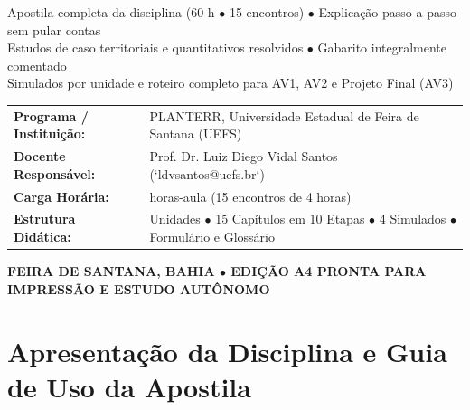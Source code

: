 \begin{titlepage}
\begin{center}
  {\color{bgAmber}\normalsize Apostila completa da disciplina (60 h $\bullet$ 15 encontros) $\bullet$ Explicação passo a passo sem pular contas\\
  Estudos de caso territoriais e quantitativos resolvidos $\bullet$ Gabarito integralmente comentado\\
  Simulados por unidade e roteiro completo para AV1, AV2 e Projeto Final (AV3)}
\end{center}

\vspace{3.0cm}

\begin{center}
  \begin{tcolorbox}[colback=white, colframe=etIndigo, arc=4pt, boxrule=1pt, width=0.90\textwidth, left=14pt, right=14pt, top=12pt, bottom=12pt]
    \begin{tabularx}{\textwidth}{@{}l >{\raggedright\arraybackslash}X@{}}
      \textbf{\color{etIndigo}Programa / Instituição:} & PLANTERR, Universidade Estadual de Feira de Santana (UEFS) \\
      \textbf{\color{etIndigo}Docente Responsável:} & Prof. Dr. Luiz Diego Vidal Santos (`ldvsantos@uefs.br`) \\
      \textbf{\color{etIndigo}Carga Horária:} & 60 horas-aula (15 encontros de 4 horas) \\
      \textbf{\color{etIndigo}Estrutura Didática:} & 4 Unidades $\bullet$ 15 Capítulos em 10 Etapas $\bullet$ 4 Simulados $\bullet$ Formulário e Glossário \\
    \end{tabularx}
  \end{tcolorbox}
\end{center}

\vfill
\begin{center}
  {\small\color{etMuted}\bfseries FEIRA DE SANTANA, BAHIA $\bullet$ EDIÇÃO A4 PRONTA PARA IMPRESSÃO E ESTUDO AUTÔNOMO}
\end{center}
\end{titlepage}

\cleardoublepage
{}
{}
\chapter*{Apresentação da Disciplina e Guia de Uso da Apostila}

